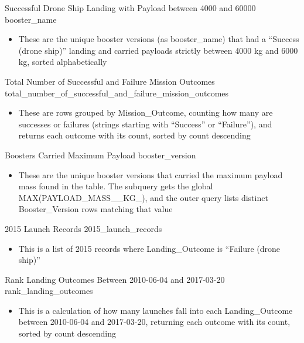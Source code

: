\begin{frame}{Successful Drone Ship Landing with Payload between 4000 and 60000}
    {booster_name}
    \begin{itemize}
        \item These are the unique booster versions (as booster\_name) that had a ``Success (drone ship)'' landing and carried payloads strictly between 4000 kg and 6000 kg, sorted alphabetically
    \end{itemize}
\end{frame}

\begin{frame}{Total Number of Successful and Failure Mission Outcomes}
    {total_number_of_successful_and_failure_mission_outcomes}
    \begin{itemize}
        \item These are rows grouped by Mission\_Outcome, counting how many are successes or failures (strings starting with ``Success'' or ``Failure''), and returns each outcome with its count, sorted by count descending
    \end{itemize}
\end{frame}

\begin{frame}{Boosters Carried Maximum Payload}
    {booster_version}
    \begin{itemize}
        \item These are the unique booster versions that carried the maximum payload mass found in the table. The subquery gets the global MAX(PAYLOAD\_MASS\_\_KG\_), and the outer query lists distinct Booster\_Version rows matching that value
    \end{itemize}
\end{frame}

\begin{frame}{2015 Launch Records}
    {2015_launch_records}
    \begin{itemize}
        \item This is a list of 2015 records where Landing\_Outcome is ``Failure (drone ship)''
    \end{itemize}
\end{frame}

\begin{frame}{Rank Landing Outcomes Between 2010-06-04 and 2017-03-20}
    {rank_landing_outcomes}
    \begin{itemize}
        \item This is a calculation of how many launches fall into each Landing\_Outcome between 2010-06-04 and 2017-03-20, returning each outcome with its count, sorted by count descending
    \end{itemize}
\end{frame}

